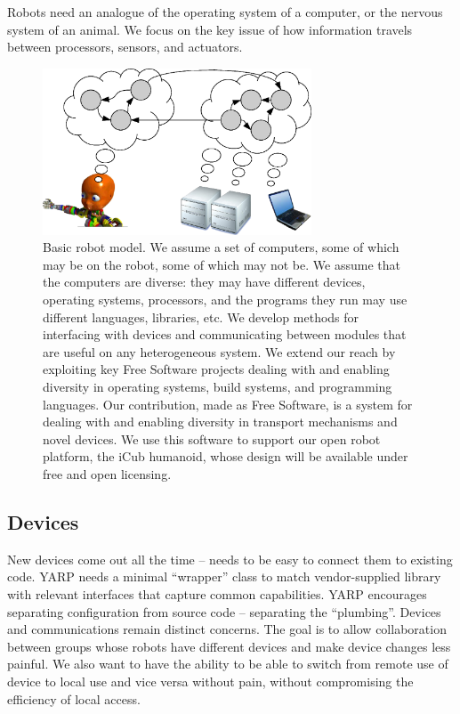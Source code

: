 


Robots need an analogue of the operating system of a computer, or the
nervous system of an animal.  We focus on the key issue of how information
travels between processors, sensors, and actuators.



\begin{figure}
\centerline{
\includegraphics[width=8cm]{fig-nethead}
}
\caption{
%
Basic robot model.  We assume a set of computers, some of which may be
on the robot, some of which may not be.  We assume that the computers
are diverse: they may have different devices, operating systems,
processors, and the programs they run may use different languages,
libraries, etc.  
%
We develop methods for interfacing with devices and communicating
between modules that are useful on any heterogeneous system.
%
We extend our reach by exploiting key Free Software projects
dealing with and enabling diversity in operating systems, build systems, 
and programming languages.
%
Our contribution, made as Free Software, is a system for dealing
with and enabling diversity in transport mechanisms and novel devices.
%
%
%
We use this software to support our open robot platform, the iCub
humanoid, whose design will be available under free and open
licensing.
%
}
\end{figure}



\subsection*{Devices}

New devices come out all the time -- needs to be easy to connect them
to existing code.  YARP needs a minimal ``wrapper'' class to match
vendor-supplied library with relevant interfaces that capture common
capabilities.  YARP encourages separating configuration from source
code -- separating the ``plumbing''.  Devices and communications
remain distinct concerns.  The goal is to allow collaboration between
groups whose robots have different devices and make device changes
less painful.  We also want to have the ability to be able to switch
from remote use of device to local use and vice versa without pain,
without compromising the efficiency of local access.

